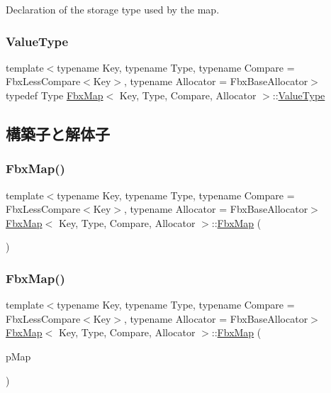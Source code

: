 Declaration of the storage type used by the map. 

\mbox{\label{class_fbx_map_abea530b1192b31c3cf05fbf247e3dcaa}} 
\subsubsection{\texorpdfstring{Value\+Type}{ValueType}}
{\footnotesize\ttfamily template$<$typename Key, typename Type, typename Compare = Fbx\+Less\+Compare$<$\+Key$>$, typename Allocator = Fbx\+Base\+Allocator$>$ \\
typedef Type \hyperlink{class_fbx_map}{Fbx\+Map}$<$ Key, Type, Compare, Allocator $>$\+::\hyperlink{class_fbx_map_abea530b1192b31c3cf05fbf247e3dcaa}{Value\+Type}}



\subsection{構築子と解体子}
\mbox{\label{class_fbx_map_a273b204e69895fed84c1193491f992c8}} 
\subsubsection{\texorpdfstring{Fbx\+Map()}{FbxMap()}\hspace{0.1cm}{\footnotesize\ttfamily [1/2]}}
{\footnotesize\ttfamily template$<$typename Key, typename Type, typename Compare = Fbx\+Less\+Compare$<$\+Key$>$, typename Allocator = Fbx\+Base\+Allocator$>$ \\
\hyperlink{class_fbx_map}{Fbx\+Map}$<$ Key, Type, Compare, Allocator $>$\+::\hyperlink{class_fbx_map}{Fbx\+Map} (\begin{DoxyParamCaption}{ }\end{DoxyParamCaption})}

\mbox{\label{class_fbx_map_a3b0b46c7a7698ab185aea731bfe52b69}} 
\subsubsection{\texorpdfstring{Fbx\+Map()}{FbxMap()}\hspace{0.1cm}{\footnotesize\ttfamily [2/2]}}
{\footnotesize\ttfamily template$<$typename Key, typename Type, typename Compare = Fbx\+Less\+Compare$<$\+Key$>$, typename Allocator = Fbx\+Base\+Allocator$>$ \\
\hyperlink{class_fbx_map}{Fbx\+Map}$<$ Key, Type, Compare, Allocator $>$\+::\hyperlink{class_fbx_map}{Fbx\+Map} (\begin{DoxyParamCaption}\item[{const \hyperlink{class_fbx_map}{Fbx\+Map}$<$ Key, Type, Compare, Allocator $>$ \&}]{p\+Map }\end{DoxyParamCaption})}

